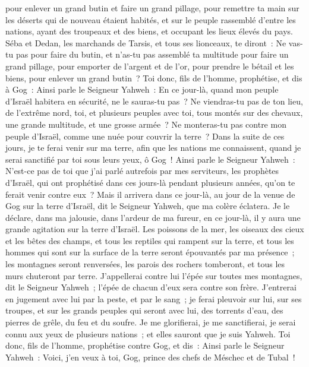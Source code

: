 \begin{multicols}{2}
pour enlever un grand butin et faire un grand pillage, pour remettre ta main sur les déserts qui de nouveau étaient habités, et sur le peuple rassemblé d'entre les nations, ayant des troupeaux et des biens, et occupant les lieux élevés du pays.
Séba et Dedan, les marchands de Tarsis, et tous ses lionceaux, te diront~: Ne vas-tu pas pour faire du butin, et n'as-tu pas assemblé ta multitude pour faire un grand pillage, pour emporter de l'argent et de l'or, pour prendre le bétail et les biens, pour enlever un grand butin~?
Toi donc, fils de l'homme, prophétise, et dis à Gog~: Ainsi parle le Seigneur Yahweh~: En ce jour-là, quand mon peuple d'Israël habitera en sécurité, ne le sauras-tu pas~?
Ne viendras-tu pas de ton lieu, de l'extrême nord, toi, et plusieurs peuples avec toi, tous montés sur des chevaux, une grande multitude, et une grosse armée~?
Ne monteras-tu pas contre mon peuple d'Israël, comme une nuée pour couvrir la terre~? Dans la suite de ces jours, je te ferai venir sur ma terre, afin que les nations me connaissent, quand je serai sanctifié par toi sous leurs yeux, ô Gog~!
Ainsi parle le Seigneur Yahweh~: N'est-ce pas de toi que j'ai parlé autrefois par mes serviteurs, les prophètes d'Israël, qui ont prophétisé dans ces jours-là pendant plusieurs années, qu'on te ferait venir contre eux~?
Mais il arrivera dans ce jour-là, au jour de la venue de Gog sur la terre d'Israël, dit le Seigneur Yahweh, que ma colère éclatera.
Je le déclare, dans ma jalousie, dans l'ardeur de ma fureur, en ce jour-là, il y aura une grande agitation sur la terre d'Israël.
Les poissons de la mer, les oiseaux des cieux et les bêtes des champs, et tous les reptiles qui rampent sur la terre, et tous les hommes qui sont sur la surface de la terre seront épouvantés par ma présence~; les montagnes seront renversées, les parois des rochers tomberont, et tous les murs chuteront par terre.
J'appellerai contre lui l'épée sur toutes mes montagnes, dit le Seigneur Yahweh~; l'épée de chacun d'eux sera contre son frère.
J'entrerai en jugement avec lui par la peste, et par le sang~; je ferai pleuvoir sur lui, sur ses troupes, et sur les grands peuples qui seront avec lui, des torrents d'eau, des pierres de grêle, du feu et du soufre.
Je me glorifierai, je me sanctifierai, je serai connu aux yeux de plusieurs nations~; et elles sauront que je suis Yahweh.
\VerseOne{}Toi donc, fils de l'homme, prophétise contre Gog, et dis~: Ainsi parle le Seigneur Yahweh~: Voici, j'en veux à toi, Gog, prince des chefs de Méschec et de Tubal~!

\end{multicols}
